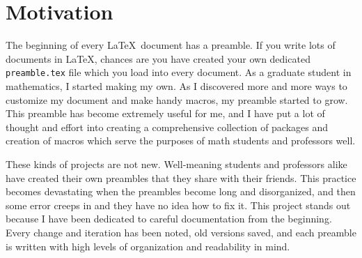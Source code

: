 \documentclass[letterpaper]{ltxdoc}
\begin{document}
\thispagestyle{plain}
\maketitle
\begin{abstract}
The following document gives a detailed overview of the collection of \LaTeX\ 
documents that comprise the \textsc{Mottaz} preambles. At this time, 
this collection includes the following documents:
\begin{itemize}
\item \texttt{HOMEWORK} edition (|homework_preamble.tex|)
\item \texttt{QUIZ} edition (|quiz_preamble.tex|)
\item \texttt{NOTES} edition (|notes_preamble.tex|)
\end{itemize}
Each document is essentially a standalone preamble. They each define a page 
layout, load packages, and define useful commands that help create documents 
for their intended end use.

Along with the \texttt{.tex} files listed above are corresponding \texttt{.fmt} 
files, compiled using the 
\href{http://mirror.hmc.edu/ctan/macros/latex/contrib/mylatexformat/mylatexformat.pdf}
{\texttt{mylatexformat}} tool. Look ahead in the \hyperref[sec:usepream]{Using 
a Preamble} section.
\end{abstract}
\tableofcontents
\section{Motivation}
The beginning of every \LaTeX\ document has a preamble. If you write lots of 
documents in \LaTeX , chances are you have created your own dedicated 
\texttt{preamble.tex} file which you load into every document. As a graduate 
student in mathematics, I started making my own. As I discovered more and more 
ways to customize my document and make handy macros, my preamble started to 
grow. This preamble has become extremely useful for me, and I have put a lot of 
thought and effort into creating a comprehensive collection of packages and 
creation of macros which serve the purposes of math students and professors 
well.

These kinds of projects are not new. Well-meaning students and professors alike 
have created their own preambles that they share with their friends. This 
practice becomes devastating when the preambles become long and disorganized, 
and then some error creeps in and they have no idea how to fix it. This project 
stands out because I have been dedicated to careful documentation from the 
beginning. Every change and iteration has been noted, old versions saved, and 
each preamble is written with high levels of organization and readability in 
mind.
\end{document}
